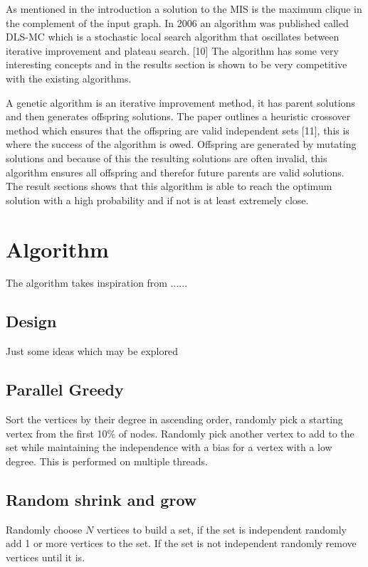 \documentclass[conference]{IEEEtran}
\begin{document}
As mentioned in the introduction a solution to the MIS is the maximum clique in the complement of the input graph. In
2006 an algorithm was published called DLS-MC which is a stochastic local search algorithm that oscillates between
iterative improvement and plateau search. [10] The algorithm has some very interesting concepts and in the results 
section is shown to be very competitive with the existing algorithms.

A genetic algorithm is an iterative improvement method, it has parent solutions and then generates offspring solutions.
The paper outlines a heuristic crossover method which ensures that the offspring are valid independent sets [11], this
is where the success of the algorithm is owed. Offspring are generated by mutating solutions and because of this the
resulting solutions are often invalid, this algorithm ensures all offspring and therefor future parents are valid 
solutions. The result sections shows that this algorithm is able to reach the optimum solution with a high probability
and if not is at least extremely close.


\section{Algorithm}

The algorithm takes inspiration from ......

\subsection{Design}

Just some ideas which may be explored

\subsection{Parallel Greedy}

Sort the vertices by their degree in ascending order, randomly pick a starting vertex from the first 10\% of nodes. 
Randomly pick another vertex to add to the set while maintaining the independence with a bias for a vertex with a low 
degree. This is performed on multiple threads.

\subsection{Random shrink and grow}

Randomly choose $N$ vertices to build a set, if the set is independent randomly add 1 or more vertices to the set.
If the set is not independent randomly remove vertices until it is.
\end{document}

